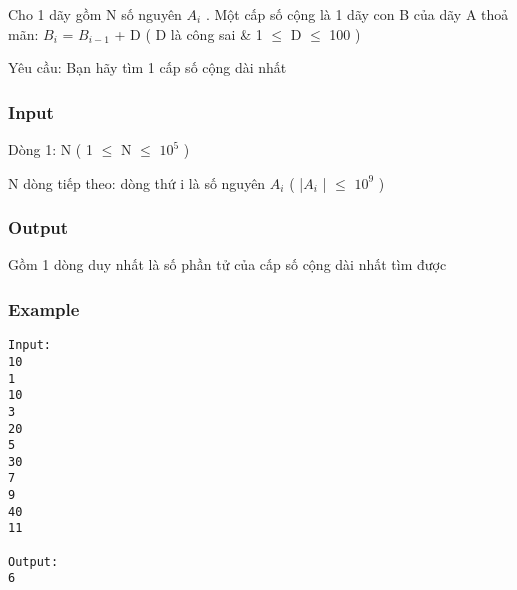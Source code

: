 



   Cho 1 dãy gồm N số nguyên  $A_{i}$   . Một cấp số cộng là 1 dãy con B của dãy A thoả mãn: $B_{i}$   =  $B_{i-1}$   + D ( D là công sai \& 1  $\le$  D  $\le$  100 )  

   Yêu cầu: Bạn hãy tìm 1 cấp số cộng dài nhất  

\subsubsection{   Input  }

   Dòng 1: N ( 1  $\le$  N  $\le$  $10^{5}$   )  

   N dòng tiếp theo: dòng thứ  i  là số nguyên  $A_{i}$   ( |$A_{i}$   |  $\le$  $10^{9}$   )  

\subsubsection{   Output  }

   Gồm 1 dòng duy nhất là số phần tử của cấp số cộng dài nhất tìm được  

\subsubsection{   Example  }
\begin{verbatim}
Input:
10
1
10
3
20
5
30
7
9
40
11

Output:
6
\end{verbatim}
